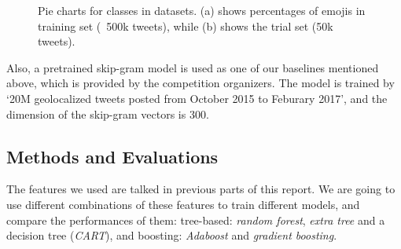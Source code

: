 \documentclass[english, table, latin9]{article}
\begin{document}
\begin{figure}[t]
	\centering
	\caption{Pie charts for classes in datasets. (a) shows percentages of emojis in training set (~500k tweets), while (b) shows the trial set (50k tweets).}
	\label{fig: imbalanced}
\end{figure}

Also, a pretrained skip-gram model is used as one of our baselines mentioned above, which is provided by the competition organizers. The model is trained by `20M geolocalized tweets posted from October 2015 to Feburary 2017', and the dimension of the skip-gram vectors is 300\cite{skipgram}.

\subsection{Methods and Evaluations}
The features we used are talked in previous parts of this report. We are going to use different combinations of these features to train different models, and compare the performances of them: tree-based: \emph{random forest}, \emph{extra tree} and a decision tree (\emph{CART}), and boosting: \emph{Adaboost} and \emph{gradient boosting}.
\end{document}
